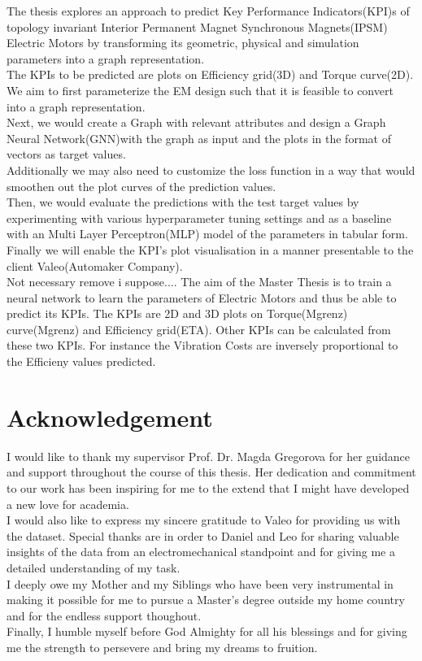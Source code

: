 \documentclass{report} %
\begin{document}
The thesis explores an approach to predict Key Performance Indicators(KPI)s of topology invariant Interior Permanent Magnet Synchronous Magnets(IPSM) Electric Motors by transforming its geometric, physical and simulation parameters into a graph representation. \\
The KPIs to be predicted are plots on Efficiency grid(3D) and Torque curve(2D).\\
We aim to first parameterize the EM design such that it is feasible to convert into a graph representation. \\
Next, we would create a Graph with relevant attributes and design a Graph Neural Network(GNN)with the graph as input and the plots in the format of vectors as target values.\\
Additionally we may also need to customize the loss function in a way that would smoothen out the plot curves of the prediction values.\\
Then, we would evaluate the predictions with the test target values by experimenting with various hyperparameter tuning settings and as a baseline with an Multi Layer Perceptron(MLP) model of the parameters in tabular form.\\
Finally we will enable the KPI's plot visualisation in a manner presentable to the client Valeo(Automaker Company).\\
Not necessary remove i suppose....
The aim of the Master Thesis is to train a neural network to learn the parameters of Electric Motors and thus be able to predict its KPIs.
The KPIs are 2D and 3D plots on Torque(Mgrenz) curve(Mgrenz) and Efficiency grid(ETA). Other KPIs can be calculated from these two KPIs.
For instance the Vibration Costs are inversely proportional to the Efficieny values predicted. 


\newpage 

\newpage 

\chapter*{Acknowledgement}
I would like to thank my supervisor Prof. Dr. Magda Gregorova for her guidance and support throughout the course of this thesis.
Her dedication and commitment to our work has been inspiring for me to the extend that I might have developed a new love for academia. \\
I would also like to express my sincere gratitude to Valeo for providing us with the dataset.
Special thanks are in order to Daniel and Leo for sharing valuable insights of the data from an electromechanical standpoint and for giving me a detailed understanding of my task. \\
I deeply owe my Mother and my Siblings who have been very instrumental in making it possible for me to pursue a Master's degree outside my home country and for the endless support thoughout.\\
Finally, I humble myself before God Almighty for all his blessings and for giving me the strength to persevere and bring my dreams to fruition.\\
\end{document}
